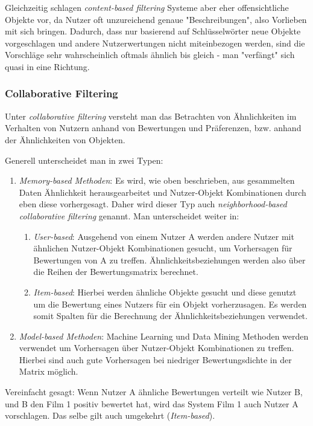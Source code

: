 Gleichzeitig schlagen \textit{content-based filtering} Systeme aber eher offensichtliche Objekte vor, da Nutzer oft unzureichend genaue "Beschreibungen", also Vorlieben mit sich bringen. Dadurch, dass nur basierend auf Schlüsselwörter neue Objekte vorgeschlagen und andere Nutzerwertungen nicht miteinbezogen werden, sind die Vorschläge sehr wahrscheinlich oftmals ähnlich bis gleich - man "verfängt" sich quasi in eine Richtung.\cite{aggarwal2016}

\subsubsection{Collaborative Filtering}
Unter \textit{collaborative filtering} versteht man das Betrachten von Ähnlichkeiten im Verhalten von Nutzern anhand von Bewertungen und Präferenzen, bzw. anhand der Ähnlichkeiten von Objekten.

Generell unterscheidet man in zwei Typen:\cite{aggarwal2016}

\begin{enumerate}		
	\item \textit{Memory-based Methoden}: Es wird, wie oben beschrieben, aus gesammelten Daten Ähnlichkeit herausgearbeitet und Nutzer-Objekt Kombinationen durch eben diese vorhergesagt. Daher wird dieser Typ auch \textit{neighborhood-based collaborative filtering} genannt. Man unterscheidet weiter in:
	\begin{enumerate}
		\item \textit{User-based}: Ausgehend von einem Nutzer A werden andere Nutzer mit ähnlichen Nutzer-Objekt Kombinationen gesucht, um Vorhersagen für Bewertungen von A zu treffen. Ähnlichkeitsbeziehungen werden also über die Reihen der Bewertungsmatrix berechnet.
		\item \textit{Item-based}: Hierbei werden ähnliche Objekte gesucht und diese genutzt um die Bewertung eines Nutzers für ein Objekt vorherzusagen. Es werden somit Spalten für die Berechnung der Ähnlichkeitsbeziehungen verwendet.
	\end{enumerate}
	\item \textit{Model-based Methoden}: Machine Learning und Data Mining Methoden werden verwendet um Vorhersagen über Nutzer-Objekt Kombinationen zu treffen. Hierbei sind auch gute Vorhersagen bei niedriger Bewertungsdichte in der Matrix möglich.
\end{enumerate}

Vereinfacht gesagt: Wenn Nutzer A ähnliche Bewertungen verteilt wie Nutzer B, und B den Film 1 positiv bewertet hat, wird das System Film 1 auch Nutzer A vorschlagen. Das selbe gilt auch umgekehrt (\textit{Item-based}).

